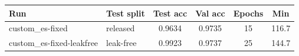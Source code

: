 \begin{tabular}{llcccc}
\toprule
Run & Test split & Test acc & Val acc & Epochs & Min \\
\midrule
custom\_es-fixed & released & 0.9634 & 0.9735 & 15 & 116.7\\
custom\_es-fixed-leakfree & leak-free & 0.9923 & 0.9737 & 25 & 144.7 \\
\bottomrule
\end{tabular}
